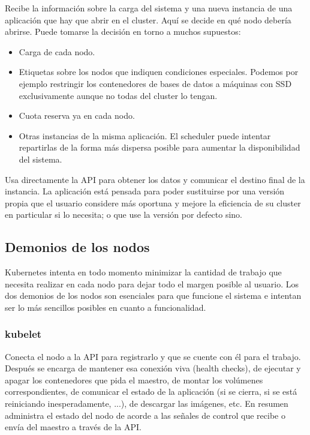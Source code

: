 Recibe la información sobre la carga del sistema y una nueva instancia de una aplicación que hay que abrir en el cluster. Aquí se decide en qué nodo debería abrirse. Puede tomarse la decisión en torno a muchos supuestos:

\begin{itemize}
  \item Carga de cada nodo.
  \item Etiquetas sobre los nodos que indiquen condiciones especiales. Podemos por ejemplo restringir los contenedores de bases de datos a máquinas con SSD exclusivamente aunque no todas del cluster lo tengan.
  \item Cuota reserva ya en cada nodo.
  \item Otras instancias de la misma aplicación. El scheduler puede intentar repartirlas de la forma más dispersa posible para aumentar la disponibilidad del sistema.
\end{itemize}

Usa directamente la API para obtener los datos y comunicar el destino final de la instancia. La aplicación está pensada para poder sustituirse por una versión propia que el usuario considere más oportuna y mejore la eficiencia de su cluster en particular si lo necesita; o que use la versión por defecto sino.

\subsection{Demonios de los nodos}
\label{subsec:k8s-demonios-nodo}

Kubernetes intenta en todo momento minimizar la cantidad de trabajo que necesita realizar en cada nodo para dejar todo el margen posible al usuario. Los dos demonios de los nodos son esenciales para que funcione el sistema e intentan ser lo más sencillos posibles en cuanto a funcionalidad.

\subsubsection{kubelet}
\label{subsubsec:k8s-kubelet}

Conecta el nodo a la API para registrarlo y que se cuente con él para el trabajo. Después se encarga de mantener esa conexión viva (health checks), de ejecutar y apagar los contenedores que pida el maestro, de montar los volúmenes correspondientes, de comunicar el estado de la aplicación (si se cierra, si se está reiniciando inesperadamente, ...), de descargar las imágenes, etc. En resumen administra el estado del nodo de acorde a las señales de control que recibe o envía del maestro a través de la API.

